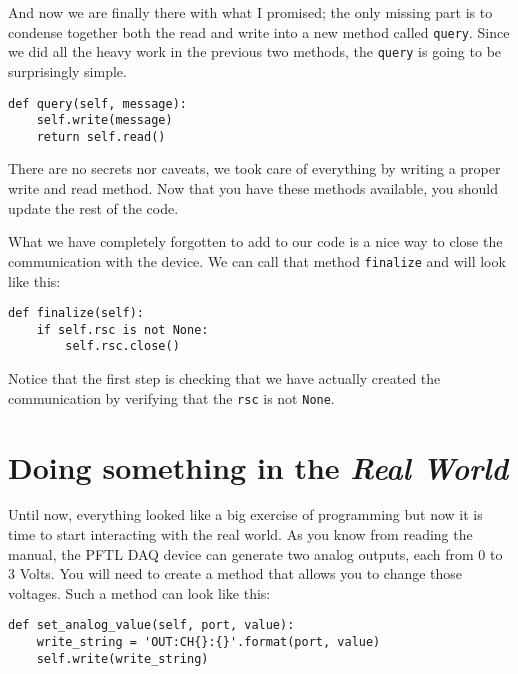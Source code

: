 And now we are finally there with what I promised; the only missing part
is to condense together both the read and write into a new method called
\texttt{query}. Since we did all the heavy work in the previous two
methods, the \texttt{query} is going to be surprisingly simple.

\begin{verbatim}
def query(self, message):
    self.write(message)
    return self.read()
\end{verbatim}

There are no secrets nor caveats, we took care of everything by writing
a proper write and read method. Now that you have these methods
available, you should update the rest of the code.


What we have completely forgotten to add to our code is a nice way to
close the communication with the device. We can call that method
\texttt{finalize} and will look like this:

\begin{verbatim}
def finalize(self):
    if self.rsc is not None:
        self.rsc.close()
\end{verbatim}

Notice that the first step is checking that we have actually created the
communication by verifying that the \texttt{rsc} is not \texttt{None}.

\hypertarget{doing-something-in-the-real-world}{}
\section{\texorpdfstring{Doing something in the
\emph{Real World}}{Doing something in the Real World}}\label{doing-something-in-the-realworld}

Until now, everything looked like a big exercise of programming but now
it is time to start interacting with the real world. As you know from
reading the manual, the {PFTL} {DAQ} device can generate two analog
outputs, each from 0 to 3 Volts. You will need to create a method that
allows you to change those voltages. Such a method can look like this:

\begin{verbatim}
def set_analog_value(self, port, value):
    write_string = 'OUT:CH{}:{}'.format(port, value)
    self.write(write_string)
\end{verbatim}

